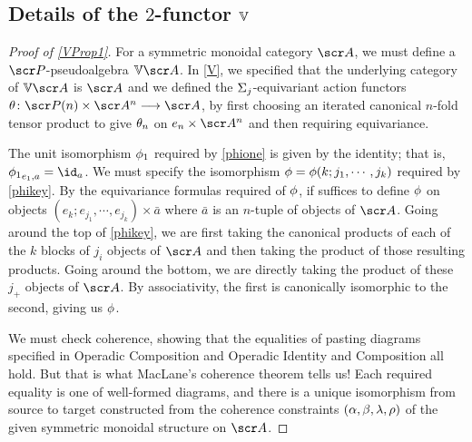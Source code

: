 \documentclass{amsart}
\theoremstyle{definition}
\numberwithin{equation}{section}
\begin{document}
\subsection{Details of the $2$-functor $\mathbb{V}$}\label{Vdetails}

\begin{proof}[Proof of \autoref{VProp1}]  For a symmetric monoidal category $\sA$, we must define a $\sP$-pseudoalgebra $\bV\sA$.  In \autoref{V}, we specified that the underlying category of $\bV\sA$ is $\sA$ and we defined the $\Sigma_j$-equivariant action functors $\tha\colon \sP(n)\times \sA^n \rtarr \sA$, by first choosing an iterated canonical $n$-fold tensor product to give $\theta_n$ on $e_n\times \sA^n$ and then requiring equivariance.   

The unit isomorphism $\phi_1$ required by \autoref{phione} is given by the identity; that is, 
${\ph_1}_{e_1, a} = \id_{a}$.  We must specify the isomorphism $\phi = \phi(k;j_1, \cdots, j_k)$ required by 
\autoref{phikey}. By the equivariance formulas required of $\phi$, if suffices to define $\phi$ on objects 
$(e_k; e_{j_1},\cdots, e_{j_k})\times \bar{a}$ where $\bar{a}$ is an $n$-tuple of objects of $\sA$.   Going around the top of \autoref{phikey}, we are first taking the canonical products of each of the $k$ blocks of $j_i$ objects of $\sA$ and then taking the product of those resulting products.  Going around the bottom, we are directly taking the product of these $j_+$ objects of $\sA$.   By associativity, the first is canonically isomorphic to the second, giving us $\phi$. 

We must check coherence, showing that the equalities of pasting diagrams specified in Operadic Composition and Operadic Identity and Composition all hold.  But that is what MacLane's coherence theorem tells us!  Each    
required equality is one of well-formed diagrams, and there is a unique isomorphism from source to target constructed from the coherence constraints $(\alpha, \beta, \lambda, \rho)$ of the given symmetric monoidal structure on 
$\sA$. 
\end{proof}
\end{document}

